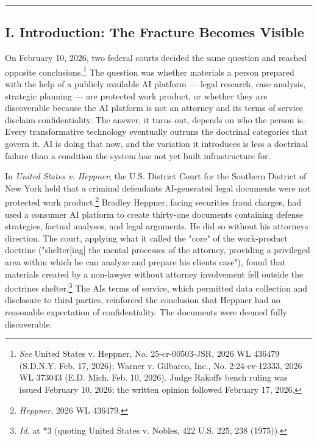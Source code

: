 \documentclass[
  12pt,
]{article}
\begin{document}
\begin{center}\rule{0.5\linewidth}{0.5pt}\end{center}

\subsection{I. Introduction: The Fracture Becomes
Visible}\label{i-introduction-the-fracture-becomes-visible}

On February 10, 2026, two federal courts decided the same question and
reached opposite conclusions.\footnote{\emph{See} United States v.
  Heppner, No. 25-cr-00503-JSR, 2026 WL 436479 (S.D.N.Y. Feb. 17, 2026);
  Warner v. Gilbarco, Inc., No. 2:24-cv-12333, 2026 WL 373043 (E.D.
  Mich. Feb. 10, 2026). Judge Rakoff\textquotesingle s bench ruling was
  issued February 10, 2026; the written opinion followed February 17,
  2026.} The question was whether materials a person prepared with the
help of a publicly available AI platform --- legal research, case
analysis, strategic planning --- are protected work product, or whether
they are discoverable because the AI platform is not an attorney and its
terms of service disclaim confidentiality. The answer, it turns out,
depends on who the person is. Every transformative technology eventually
outruns the doctrinal categories that govern it. AI is doing that now,
and the variation it introduces is less a doctrinal failure than a
condition the system has not yet built infrastructure for.

In \emph{United States v. Heppner}, the U.S. District Court for the
Southern District of New York held that a criminal
defendant\textquotesingle s AI-generated legal documents were not
protected work product.\footnote{\emph{Heppner}, 2026 WL 436479.}
Bradley Heppner, facing securities fraud charges, had used a consumer AI
platform to create thirty-one documents containing defense strategies,
factual analyses, and legal arguments. He did so without his
attorney\textquotesingle s direction. The court, applying what it called
the "core" of the work-product doctrine ("shelter{[}ing{]} the mental
processes of the attorney, providing a privileged area within which he
can analyze and prepare his client\textquotesingle s case"), found that
materials created by a non-lawyer without attorney involvement fell
outside the doctrine\textquotesingle s shelter.\footnote{\emph{Id.} at
  *3 (quoting United States v. Nobles, 422 U.S. 225, 238 (1975)).} The
AI\textquotesingle s terms of service, which permitted data collection
and disclosure to third parties, reinforced the conclusion that Heppner
had no reasonable expectation of confidentiality. The documents were
deemed fully discoverable.
\end{document}
